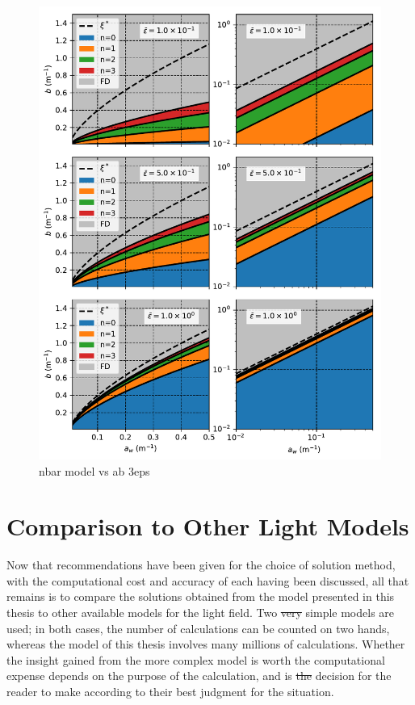 \documentclass[ms,cpyr,lof,lot]{uathesis}
\providecommand{\DIFadd}[1]{{\protect\color{blue}\uwave{#1}}} %
\providecommand{\DIFdel}[1]{{\protect\color{red}\sout{#1}}}                      %
\providecommand{\DIFaddbegin}{} %
\providecommand{\DIFaddend}{} %
\providecommand{\DIFdelbegin}{} %
\providecommand{\DIFdelend}{} %
\newcommand{\DIFscaledelfig}{0.5}
\newlength{\DIFdelgraphicswidth} %
\newlength{\DIFdelgraphicsheight} %
\newcommand{\DIFaddincludegraphics}[2][]{{\color{blue}\fbox{\DIFOincludegraphics[#1]{#2}}}} %
\newcommand{\DIFdelincludegraphics}[2][]{%
\sbox{\DIFdelgraphicsbox}{\DIFOincludegraphics[#1]{#2}}%
\settoboxwidth{\DIFdelgraphicswidth}{\DIFdelgraphicsbox} %
\settoboxtotalheight{\DIFdelgraphicsheight}{\DIFdelgraphicsbox} %
\scalebox{\DIFscaledelfig}{%
\parbox[b]{\DIFdelgraphicswidth}{\usebox{\DIFdelgraphicsbox}\\[-\baselineskip] \rule{\DIFdelgraphicswidth}{0em}}\llap{\resizebox{\DIFdelgraphicswidth}{\DIFdelgraphicsheight}{%
\setlength{\unitlength}{\DIFdelgraphicswidth}%
\begin{picture}(1,1)%
\thicklines\linethickness{2pt} %
{\color[rgb]{1,0,0}\put(0,0){\framebox(1,1){}}}%
{\color[rgb]{1,0,0}\put(0,0){\line( 1,1){1}}}%
{\color[rgb]{1,0,0}\put(0,1){\line(1,-1){1}}}%
\end{picture}%
}\hspace*{3pt}}} %
} %
\DeclareRobustCommand{\DIFaddbegin}{\DIFOaddbegin \let\includegraphics\DIFaddincludegraphics} %
\DeclareRobustCommand{\DIFaddend}{\DIFOaddend \let\includegraphics\DIFOincludegraphics} %
\DeclareRobustCommand{\DIFdelbegin}{\DIFOdelbegin \let\includegraphics\DIFdelincludegraphics} %
\DeclareRobustCommand{\DIFdelend}{\DIFOaddend \let\includegraphics\DIFOincludegraphics} %
\begin{document}
\begin{figure}[H]
  \centering
  \includegraphics[width=5in]{nbar_model_vs_ab_3eps}
  \caption{nbar model vs ab 3eps}
  \label{fig:nbar_model_vs_ab_3eps}
\end{figure}


\section{Comparison to Other Light Models}

Now that recommendations have been given for the choice of solution method, with the computational cost and accuracy of each having been discussed, all that remains is to compare the solutions obtained from the model presented in this thesis to other available models for the light field.
Two \DIFdelbegin \DIFdel{very }\DIFdelend simple models are used; in both cases, the number of calculations can be counted on two hands, whereas the model of this thesis involves many millions of calculations.
Whether the insight gained from the more complex model is worth the computational expense depends on the purpose of the calculation, and is \DIFdelbegin \DIFdel{the }\DIFdelend \DIFaddbegin \DIFadd{a }\DIFaddend decision for the reader to make according to their best judgment for the situation.
\end{document}
